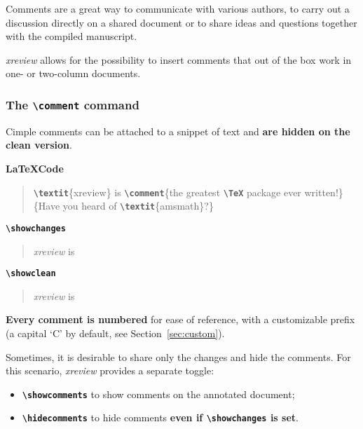 \documentclass[a4paper]{ltxdoc}
\newcommand{\writecommand}[1]{\texttt{\textbf{{\textbackslash#1}}}}
\newcommand{\writearg}[1]{\{#1\}}
\begin{document}
Comments are a great way to communicate with various authors, to carry out a discussion directly on a shared document or to share ideas and questions together with the compiled manuscript.

\textit{xreview} allows for the possibility to insert comments that out of the box work in one- or two-column documents. 

\subsubsection{The \writecommand{comment} command}

Cimple comments can be attached to a snippet of text and \textbf{are hidden on the clean version}. 

\textbf{\LaTeX Code}

\begin{quote}
\writecommand{textit}\writearg{xreview} is \writecommand{comment}\writearg{the greatest \writecommand{TeX} package ever written!}\writearg{Have you heard of \writecommand{textit}\writearg{amsmath}?}
\end{quote}

\writecommand{showchanges}
\showchanges

\begin{quote}
\textit{xreview} is 
\end{quote}

\writecommand{showclean}
\showclean

\begin{quote}
\textit{xreview} is 
\end{quote} \addtocounter{commentcounter}{-1}

\showchanges

\textbf{Every comment is numbered} for ease of reference, with a customizable prefix (a capital `C' by default, see Section~\ref{sec:custom}).

Sometimes, it is desirable to share only the changes and hide the comments. For this scenario, \textit{xreview} provides a separate toggle:
\begin{itemize}
    \item \writecommand{showcomments} to show comments on the annotated document;
    \item \writecommand{hidecomments} to hide comments \textbf{even if \writecommand{showchanges} is set}.
\end{itemize}
\end{document}
